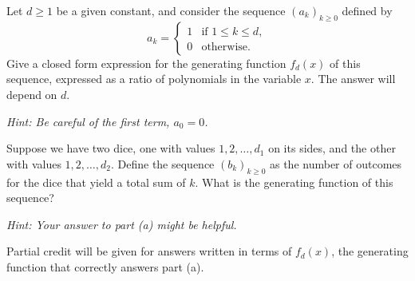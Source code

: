 \documentclass[12pt]{article}
\begin{document}
\begin{problem}{15}

    \bparts

     Let $d \geq 1$ be a given constant, and consider the sequence $(a_k)_{k \geq 0}$ defined by
    $$ a_k = \begin{cases} 1 & \text{if }1 \leq k \leq d, \\ 0 & \text{otherwise}. \end{cases} $$
    Give a closed form expression for the generating function $f_d(x)$ of this sequence, expressed as a ratio of polynomials in the variable $x$. The answer will depend on $d$.

    {\it Hint: Be careful of the first term, $a_0 = 0$.}


     Suppose we have two dice, one with values $1, 2, \ldots, d_1$ on its sides, and the other with values $1, 2, \ldots, d_2$. Define the sequence $(b_k)_{k \geq 0}$ as the number of outcomes for the dice that yield a total sum of $k$. What is the generating function of this sequence?

    {\it Hint: Your answer to part (a) might be helpful. }

    Partial credit will be given for answers written in terms of $f_d(x)$, the generating function that correctly answers part (a).


    \eparts

\end{problem}
\newpage
\end{document}
